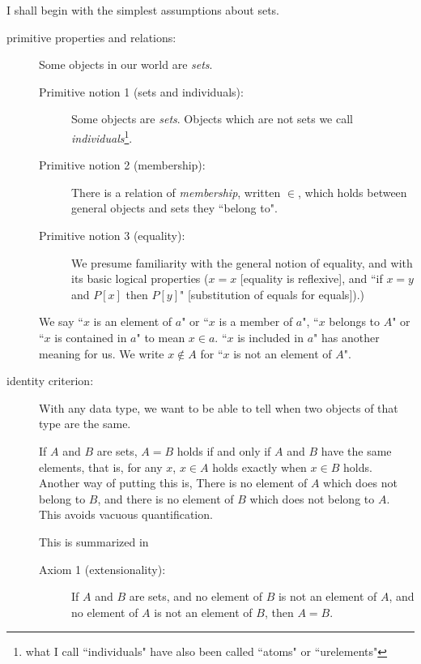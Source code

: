 \documentclass[12pt]{article}
\begin{document}
I shall begin with the simplest assumptions about sets.

\begin{description}

\item[primitive properties and relations:]  Some objects in our world are {\em sets\/}.  

\begin{description}

\item[Primitive notion 1 (sets and individuals):]  Some objects are {\em sets\/}.  Objects which are not sets we call {\em individuals\/}\footnote{what I call ``individuals" have also been called ``atoms" or ``urelements"}.

\item[Primitive notion 2 (membership):]  There is a relation of {\em membership}, written $\in$, which holds between general objects and sets they ``belong to".

\item[Primitive notion 3 (equality):]  We presume familiarity with the general notion of equality, and with its basic logical properties ($x=x$ [equality is reflexive], and ``if $x=y$ and $P[x]$ then $P[y]$" [substitution of equals for equals]).)

\end{description} 

We say ``$x$ is an element of $a$" or ``$x$ is a member of $a$", ``$x$ belongs to $A$" or ``$x$ is contained in $a$" to mean $x \in a$.   ``$x$ is included in $a$" has another meaning for us.  We write $x \not\in A$ for ``$x$ is not an element of $A$".

\item[identity criterion:]  With any data type, we want to be able to tell when two objects of that type are the same.

If $A$ and $B$ are sets, $A=B$ holds if and only if $A$ and $B$ have the same elements, that is, for any $x$, $x \in A$ holds exactly when $x \in B$ holds.   Another way of putting this is, There is no element of $A$ which does not belong to $B$, and there is no element of $B$ which does not belong to $A$.  This avoids vacuous quantification.

This is summarized in

\begin{description}

\item[Axiom 1 (extensionality):]  If $A$ and $B$ are sets, and no element of $B$ is not an element of $A$, and no element of $A$ is not an element of $B$, then $A=B$.


\end{description}
\end{description}
\end{document}
